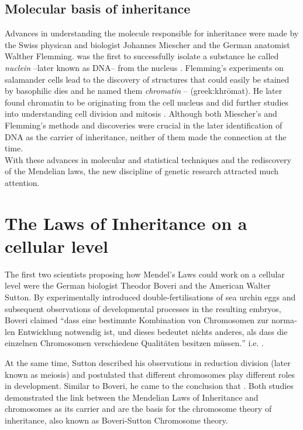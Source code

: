 \subsection{Molecular basis of inheritance}
Advances in understanding the molecule responsible for inheritance were made by the Swiss physican and biologist Johannes Miescher and the German anatomist Walther Flemming.  \citet{Miescher1871} was the first to successfully isolate a substance he called \textit{nuclein} --later known as DNA-- from the nucleus . Flemming's experiments on salamander cells lead to the discovery of structures that could easily be stained by basophilic dies and he named them \textit{chromatin} --   (greek:khrōmat). He later found chromatin to be originating from the cell nucleus and did further studies into understanding cell division and mitosis \parencite*{Flemming1878}. Although both Miescher's and Flemming's methods and discoveries were crucial in the later identification of DNA as the carrier of inheritance, neither of them made the connection at the time. 
\\
With these advances in molecular and statistical techniques and the rediscovery of the Mendelian laws, the new discipline of genetic research attracted much attention. 

\section{The Laws of Inheritance on a cellular level}
The first two scientists proposing how Mendel's Laws could work on a cellular level were the German biologist Theodor Boveri and the American Walter Sutton. By experimentally introduced double-fertilisations of sea urchin eggs and subsequent observations of developmental processes in the resulting embryos, Boveri claimed \foreignquote{german}{dass eine bestimmte Kombination von Chromosomen zur normalen Entwicklung notwendig ist, und dieses bedeutet nichts anderes, als dass die einzelnen Chromosomen verschiedene Qualit\"{a}ten besitzen m\"{u}ssen.}  i.e.  \citep{Boveri1902}. 

At the same time, Sutton described his observations in reduction division (later known as meiosis) and postulated that different chromosomes play different roles in development. Similar to Boveri, he came to the conclusion that  \parencite*{Sutton1903}. Both studies demonstrated the link between the Mendelian Laws of Inheritance and chromosomes as its carrier and are the basis for the chromosome theory of inheritance, also known as Boveri-Sutton Chromosome theory. 

